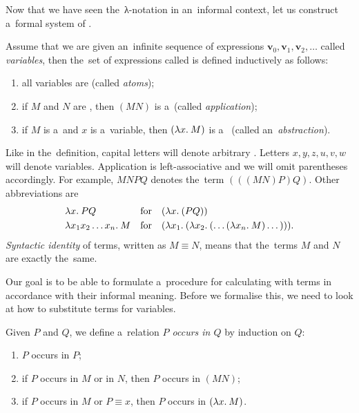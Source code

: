 Now that we have seen the~λ-notation in an~informal context, let us
construct a~formal system of \lc.
\begin{definition}\label{def:lambda_calculus}
  Assume that we are given an~infinite sequence of expressions $\mathbf{v}_0,
  \mathbf{v}_1, \mathbf{v}_2, \dots$ called \emph{variables}, then the~set of
  expressions called \lts is defined inductively as follows:
  \begin{enumerate}
    \item all variables are \lts (called \emph{atoms});
    \item if $M$ and $N$ are \lts, then $(M N)$ is a~\lt (called
      \emph{application});
    \item if $M$ is a~\lt and $x$ is a~variable, then $(\lambda x . \: M)$ is a~\lt
      (called an~\emph{abstraction}).
  \end{enumerate}
\end{definition}
Like in the~definition, capital letters will denote arbitrary \lts.
Letters $x, y, z, u, v, w$ will denote variables. Application is
left-associative and we will omit parentheses accordingly. For example,
$M N P Q$ denotes the~term $(((M N) P) Q)$. Other abbreviations are
\begin{align*}
  &{\lambda x . \: P Q}  &  &\text{for}  &  &(\lambda x . \: (P Q)) \\
  &{\lambda x_1 x_2 \dots x_n . \: M}  &  &\text{for}  &
    &(\lambda x_1 . \: (\lambda x_2 . \: (\dots(\lambda x_n . \: M) \dots))).
\end{align*}
\emph{Syntactic identity} of terms, written as $M \equiv N$, means that
the~terms $M$ and $N$ are exactly the~same.


Our goal is to be able to formulate a~procedure for calculating with terms in
accordance with their informal meaning. Before we formalise this, we need to
look at how to substitute terms for variables.

\begin{definition}
  Given \lts $P$ and $Q$, we define a~relation \emph{$P$ occurs in $Q$} by
  induction on $Q$:
  \begin{enumerate}
    \item $P$ occurs in $P$;
    \item if $P$ occurs in $M$ or in $N$, then $P$ occurs in $(M N)$;
    \item if $P$ occurs in $M$ or $P \equiv x$, then $P$ occurs in $(\lambda x . \: M)$.
  \end{enumerate}
\end{definition}


